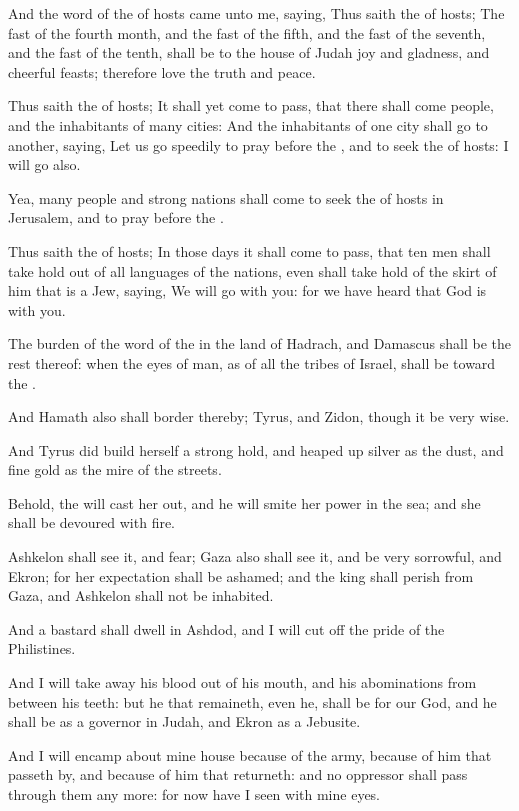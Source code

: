 \Verse And the word of the \LORD of hosts came unto me, saying, \Verse Thus saith the \LORD of hosts; The fast of the fourth month, and the fast of the fifth, and the fast of the seventh, and the fast of the tenth, shall be to the house of Judah joy and gladness, and cheerful feasts; therefore love the truth and peace.

\Verse Thus saith the \LORD of hosts; It shall yet come to pass, that there shall come people, and the inhabitants of many cities: \Verse And the inhabitants of one city shall go to another, saying, Let us go speedily to pray before the \LORD, and to seek the \LORD of hosts: I will go also.

\Verse Yea, many people and strong nations shall come to seek the \LORD of hosts in Jerusalem, and to pray before the \LORD.

\Verse Thus saith the \LORD of hosts; In those days it shall come to pass, that ten men shall take hold out of all languages of the nations, even shall take hold of the skirt of him that is a Jew, saying, We will go with you: for we have heard that God is with you.


\Chapter
\Verse The burden of the word of the \LORD in the land of Hadrach, and Damascus shall be the rest thereof: when the eyes of man, as of all the tribes of Israel, shall be toward the \LORD.

\Verse And Hamath also shall border thereby; Tyrus, and Zidon, though it be very wise.

\Verse And Tyrus did build herself a strong hold, and heaped up silver as the dust, and fine gold as the mire of the streets.

\Verse Behold, the \LORD will cast her out, and he will smite her power in the sea; and she shall be devoured with fire.

\Verse Ashkelon shall see it, and fear; Gaza also shall see it, and be very sorrowful, and Ekron; for her expectation shall be ashamed; and the king shall perish from Gaza, and Ashkelon shall not be inhabited.

\Verse And a bastard shall dwell in Ashdod, and I will cut off the pride of the Philistines.

\Verse And I will take away his blood out of his mouth, and his abominations from between his teeth: but he that remaineth, even he, shall be for our God, and he shall be as a governor in Judah, and Ekron as a Jebusite.

\Verse And I will encamp about mine house because of the army, because of him that passeth by, and because of him that returneth: and no oppressor shall pass through them any more: for now have I seen with mine eyes.

